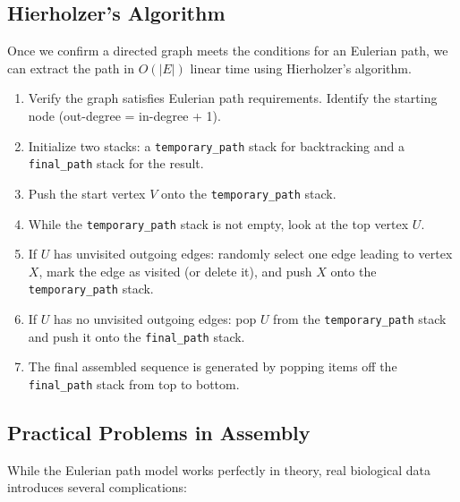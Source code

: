 \documentclass{article}
\begin{document}
\subsection{Hierholzer's Algorithm}

Once we confirm a directed graph meets the conditions for an Eulerian path, we can extract the path in $O(|E|)$ linear time using Hierholzer's algorithm.

\begin{enumerate}
    \item Verify the graph satisfies Eulerian path requirements. Identify the starting node (out-degree = in-degree + 1).
    \item Initialize two stacks: a \texttt{temporary\_path} stack for backtracking and a \texttt{final\_path} stack for the result.
    \item Push the start vertex $V$ onto the \texttt{temporary\_path} stack.
    \item While the \texttt{temporary\_path} stack is not empty, look at the top vertex $U$.
    \item If $U$ has unvisited outgoing edges: randomly select one edge leading to vertex $X$, mark the edge as visited (or delete it), and push $X$ onto the \texttt{temporary\_path} stack.
    \item If $U$ has no unvisited outgoing edges: pop $U$ from the \texttt{temporary\_path} stack and push it onto the \texttt{final\_path} stack.
    \item The final assembled sequence is generated by popping items off the \texttt{final\_path} stack from top to bottom.
\end{enumerate}

\subsection{Practical Problems in Assembly}

While the Eulerian path model works perfectly in theory, real biological data introduces several complications:
\end{document}
